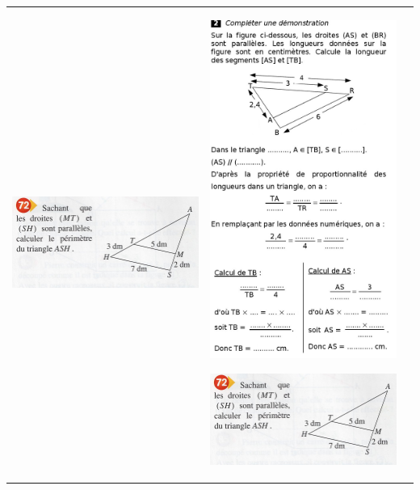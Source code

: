 \documentclass[12pt, twoside]{article}
\begin{document}
\begin{landscape}
\begin{tabular}{ccc}
\begin{minipage}{8cm}
\includegraphics[width=8cm]{images/ex72.jpg}
\end{minipage}
&
\begin{minipage}{8cm}
\includegraphics[width=8cm]{images/ex2.jpg}

\bigskip

\includegraphics[width=8cm]{images/ex72.jpg}
\end{minipage}
\end{tabular}

\end{landscape}
\end{document}
